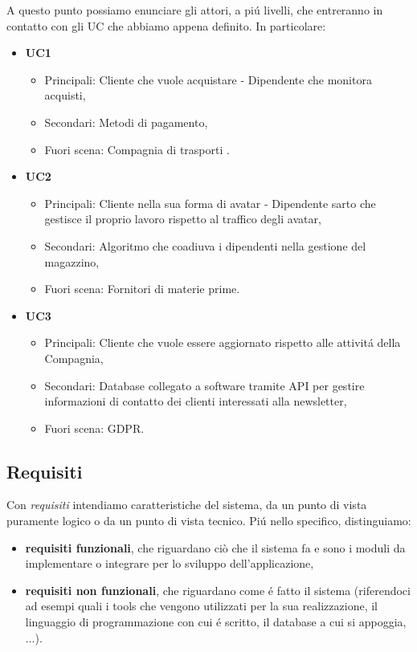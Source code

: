 \documentclass[12pt]{article}
\begin{document}
A questo punto possiamo enunciare gli attori, a pi\'u livelli, che entreranno in contatto con gli UC che abbiamo appena definito. In particolare:
\begin{itemize}
	\item \textbf{UC1}
		\begin{itemize}
		\item Principali: Cliente che vuole acquistare - Dipendente che monitora acquisti,
		\item Secondari: Metodi di pagamento,
		\item Fuori scena: Compagnia di trasporti .
		\end{itemize}
	\item \textbf{UC2}
		\begin{itemize}
		\item Principali: Cliente nella sua forma di avatar - Dipendente sarto che gestisce il proprio lavoro rispetto al traffico degli avatar,
		\item Secondari: Algoritmo che coadiuva i dipendenti nella gestione del magazzino,
		\item Fuori scena: Fornitori di materie prime.
		\end{itemize}
	\item \textbf{UC3}
		\begin{itemize}
		\item Principali: Cliente che vuole essere aggiornato rispetto alle attivit\'a della Compagnia, 
		\item Secondari: Database collegato a software tramite API per gestire informazioni di contatto dei clienti interessati alla newsletter,
		\item Fuori scena: GDPR.
		\end{itemize}
\end{itemize}

\subsection{Requisiti}

Con \textit{requisiti} intendiamo caratteristiche del sistema, da un punto di vista puramente logico o da un punto di vista tecnico. Pi\'u nello specifico, distinguiamo: 
\begin{itemize}
	\item \textbf{requisiti funzionali}, che riguardano ciò che il sistema fa e sono i moduli da implementare o integrare per lo sviluppo dell’applicazione,
	\item \textbf{requisiti non funzionali}, che riguardano come \'e fatto il sistema (riferendoci ad esempi quali i tools che vengono utilizzati per la sua realizzazione, il linguaggio di programmazione con cui \'e scritto, il database a cui si appoggia, ...).
\end{itemize}
\end{document}
